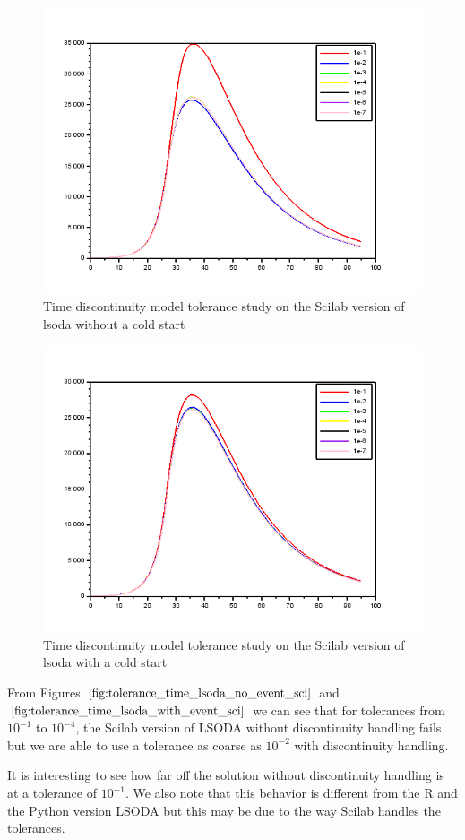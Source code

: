 \begin{figure}[H]
\centering
\includegraphics[width=0.7\linewidth]{./figures/tolerance_time_lsoda_no_event_sci}
\caption{Time discontinuity model tolerance study on the Scilab version of lsoda without a cold start}
\label{fig:tolerance_time_lsoda_no_event_sci}
\end{figure}

\begin{figure}[H]
\centering
\includegraphics[width=0.7\linewidth]{./figures/tolerance_time_lsoda_with_event_sci}
\caption{Time discontinuity model tolerance study on the Scilab version of lsoda with a cold start}
\label{fig:tolerance_time_lsoda_with_event_sci}
\end{figure}

From Figures $\ref{fig:tolerance_time_lsoda_no_event_sci}$ and $\ref{fig:tolerance_time_lsoda_with_event_sci}$ we can see that for tolerances from $10^{-1}$ to $10^{-4}$, the Scilab version of LSODA without discontinuity handling fails but we are able to use a tolerance as coarse as $10^{-2}$ with discontinuity handling. 

It is interesting to see how far off the solution without discontinuity handling is at a tolerance of $10^{-1}$. We also note that this behavior is different from the R and the Python version LSODA but this may be due to the way Scilab handles the tolerances.

